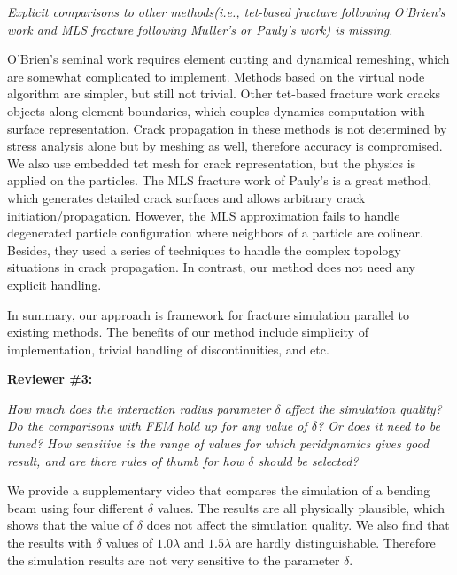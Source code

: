 \emph{Explicit comparisons to other methods(i.e., tet-based fracture following O'Brien's work and MLS fracture following M$\ddot{u}$ller's or Pauly's work) is missing.}

O'Brien's seminal work \cite{O'Brien:1999:GMA:311535.311550,O'Brien:2002:GMA:566654.566579} requires element cutting and dynamical remeshing, which are somewhat complicated to implement. Methods based on the virtual node algorithm \cite{Molino2004} are simpler, but still not trivial. Other tet-based fracture work\cite{smith2001fast,Muller2001} cracks objects along element boundaries, which couples dynamics computation with surface representation. Crack propagation in these methods is not determined by stress analysis alone but by meshing as well, therefore accuracy is compromised. We also use embedded tet mesh for crack representation, but the physics is applied on the particles. The MLS fracture work of Pauly's\cite{Pauly:2005:MAF:1073204.1073296} is a great method, which generates detailed crack surfaces and allows arbitrary crack initiation/propagation. However, the MLS approximation fails to handle degenerated particle configuration where neighbors of a particle are colinear. Besides, they used a series of techniques to handle the complex topology situations in crack propagation. In contrast, our method does not need any explicit handling.

In summary, our approach is framework for fracture simulation parallel to existing methods. The benefits of our method include simplicity of implementation, trivial handling of discontinuities, and etc.

\noindent{}\textbf{Reviewer \#3:}

\emph{How much does the interaction radius parameter $\delta$ affect the simulation quality? Do the comparisons with FEM hold up for any value of $\delta$? Or does it need to be tuned? How sensitive is the range of values for which peridynamics gives good result, and are there rules of thumb for how $\delta$ should be selected?}

We provide a supplementary video that compares the simulation of a bending beam using four different $\delta$ values. The results are all physically plausible, which shows that the value of $\delta$ does not affect the simulation quality. We also find that the results with $\delta$ values of $1.0\lambda$ and $1.5\lambda$ are hardly distinguishable. Therefore the simulation results are not very sensitive to the parameter $\delta$.

